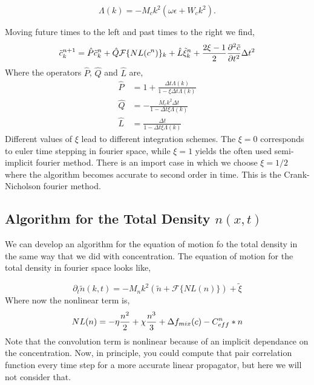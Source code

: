 \begin{equation}
\Lambda(k) = -M_c k^2\left(\omega\epsilon + W_c k^2\right).
\end{equation}

Moving future times to the left and past times to the right we find, 
%
\begin{equation}
    \tilde{c}_k^{n+1} = 
        \hat{P}\tilde{c}_k^n 
      + \hat{Q}\mathcal{F}\lbrace NL(c^n)\rbrace_k
      + \hat{L}\tilde{\xi}_k^n + \frac{2\xi - 1}{2}
            \frac{\partial^2 \tilde{c}}{\partial t^2}\Delta t^2
\end{equation}
%
Where the operators $\hat{P}$, $\hat{Q}$ and $\hat{L}$ are,
%
\begin{align}
    \hat{P} &= 1 + \frac{\Delta t \Lambda(k)}{1 - \xi\Delta t \Lambda(k)}  \\
    \hat{Q} &= -\frac{M_c k^2 \Delta t}{1 - \Delta t \xi \Lambda(k)} \\
    \hat{L} &= \frac{\Delta t}{1 - \Delta t \xi \Lambda(k)} 
\end{align}
%
Different values of $\xi$ lead to different integration schemes. The $\xi = 0$
corresponds to euler time stepping in fourier space, while $\xi = 1$ yields the
often used semi-implicit fourier method. There is an import case in which we
choose $\xi = 1/2$ where the algorithm becomes accurate to second order in
time. This is the Crank-Nicholson fourier method. 

\subsection{Algorithm for the Total Density $n(x,t)$} %

We can develop an algorithm for the equation of motion fo the total density in
the same way that we did with concentration. The equation of motion for the
total density in fourier space looks like, 

\begin{equation}
    \partial_t \tilde{n}(k, t) = 
        - M_n k^2 \left(\tilde{n} 
        + \mathcal{F}\lbrace NL(n)\rbrace\right) 
        + \tilde{\xi}
\end{equation}
%
Where now the nonlinear term is, 
%
\begin{equation}
    NL(n) = -\eta \frac{n^2}{2} + \chi \frac{n^3}{3}  + \Delta f_{mix}(c) - C_{eff}^n \ast n  
\end{equation}
%
Note that the convolution term is nonlinear because of an implicit dependance
on the concentration. Now, in principle, you could compute that pair
correlation function every time step for a more accurate linear propagator, but
here we will not consider that. 

